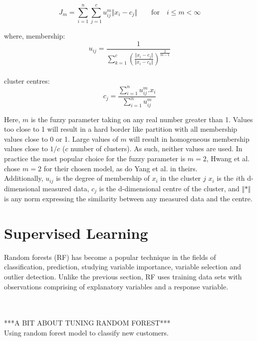 \begin{equation}
J_m = \sum_{i=1}^{n} \sum_{j=1}^{c} u_{ij}^{m} \Vert x_i - c_j \Vert  \qquad  \textrm{for}   \quad i \leq m < \infty
\end{equation}

where, membership:
\begin{equation}
u_{ij} = \frac{1}{\sum_{k=1}^c (\frac{\Vert x_i - c_j \Vert}{\Vert x_i - c_k \Vert})^ \frac{2}{m-1}}
\end{equation}\\
cluster centres:
\begin{equation}
c_j = \frac{\sum_{i=1}^n u_{ij}^m . x_i}{\sum_{i=1}^n u_{ij}^m}
\end{equation}


Here, $m$ is the fuzzy parameter taking on any real number greater than 1. Values too close to 1 will result in a hard border like partition with all membership values close to 0 or 1. Large values of $m$ will result in homogeneous membership values close to $1/c$ ($c$ number of clusters). As such, neither values are used. In practice the most popular choice for the fuzzy parameter is $m = 2$, Hwang et al. chose $m = 2$ for their chosen model, as do Yang et al. in theirs. \\


Additionally, $u_{ij}$ is the degree of membership of $x_i$ in the cluster $j$ $x_i$ is the $i$th d-dimensional measured data, $c_j$ is the d-dimensional centre of the cluster, and $\Vert * \Vert$ is any norm expressing the similarity between any measured data and the centre.

\section{Supervised Learning}
Random forests (RF) has become a popular technique in the fields of classification, prediction, studying variable importance, variable selection and outlier detection. Unlike the previous section, RF uses training data sets with observations comprising of explanatory variables and a response variable. 

\\
\\
***A BIT ABOUT TUNING RANDOM FOREST***\\
Using random forest model to classify new customers.
